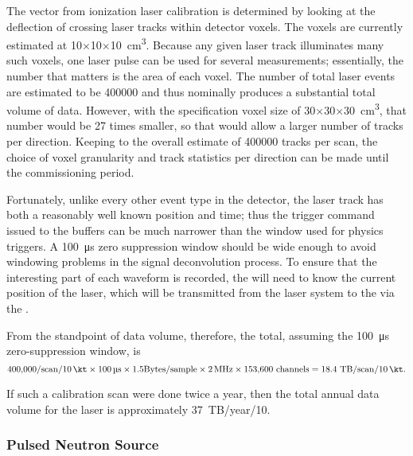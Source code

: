 The \efield vector from ionization laser calibration is determined by looking at the deflection of crossing laser tracks within detector voxels. The voxels are currently estimated at \num{10}$\times$\num{10}$\times$\SI{10}{\cubic\cm}. Because any given laser track
illuminates many such voxels, one laser pulse can be used for several
measurements; essentially, the number that matters is the area of each voxel.
The number of total laser events are estimated to be \num{400000}
and thus nominally produces a substantial total volume of data.
However, with the specification voxel size of \num{30}$\times$\num{30}$\times$\SI{30}{\cubic\cm}, that number would be \num{27} times smaller, so that would allow a larger number of tracks per direction. Keeping to the overall estimate of \num{400000} tracks per scan, the choice of voxel granularity and track statistics per direction can be made until the commissioning period.

Fortunately, unlike every other event type in the detector, the laser track has both a reasonably well known position and time; thus the trigger command issued to the  buffers can be much narrower than the window used for physics triggers. A \SI{100}{\micro\s} zero suppression window should be wide enough to avoid windowing problems in the 
signal deconvolution process. To ensure that the interesting part of each waveform is recorded, the  will need to know the current position  of the laser, which will be transmitted from the laser system to the  via the .


From the standpoint of data volume, therefore, the total, assuming the \SI{100}{\micro\s} zero-suppression window, is
\begin{equation}
\num{400000}/{\rm scan}/\SI{10}{\kt} \times \SI{100}{\micro\s} \times \num{1.5}{\rm Bytes/sample}\times \SI{2}{\mega\hertz}\times \dpnumcrpch~{\rm channels}   = \num{18.4}~{\rm TB/scan/\SI{10}{\kt}.}   
\end{equation}

If such a calibration scan were done twice a year, then the total annual data volume for the laser is approximately \num{37}~TB/year/\SI{10}{\kt}.


\subsubsection{Pulsed Neutron Source}

